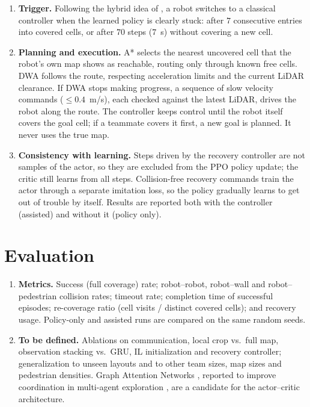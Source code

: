 \documentclass[11pt,a4paper]{article}
\begin{document}
\begin{enumerate}[label=\textbf{\arabic*.},resume]

\item \textbf{Trigger.}
Following the hybrid idea of \cite{carvalho2025deep}, a robot switches to a
classical controller when the learned policy is clearly stuck: after $7$
consecutive entries into covered cells, or after $70$ steps ($7$~s) without
covering a new cell.

\item \textbf{Planning and execution.}
A* selects the nearest uncovered cell that the robot's own map shows as
reachable, routing only through known free cells. DWA follows the route,
respecting acceleration limits and the current LiDAR clearance. If DWA stops
making progress, a sequence of slow velocity commands ($\le 0.4$~m/s), each
checked against the latest LiDAR, drives the robot along the route. The
controller keeps control until the robot itself covers the goal cell; if a
teammate covers it first, a new goal is planned. It never uses the true map.

\item \textbf{Consistency with learning.}
Steps driven by the recovery controller are not samples of the actor, so
they are excluded from the PPO policy update; the critic still learns from
all steps. Collision-free recovery commands train the actor through a
separate imitation loss, so the policy gradually learns to get out of
trouble by itself. Results are reported both with the controller (assisted)
and without it (policy only).

\end{enumerate}

\section{Evaluation}

\begin{enumerate}[label=\textbf{\arabic*.},resume]

\item \textbf{Metrics.}
Success (full coverage) rate; robot--robot, robot--wall and
robot--pedestrian collision rates; timeout rate; completion time of
successful episodes; re-coverage ratio (cell visits / distinct covered
cells); and recovery usage. Policy-only and assisted runs are compared on
the same random seeds.

\item \textbf{To be defined.}
Ablations on communication, local crop vs.\ full map, observation stacking
vs.\ GRU, IL initialization and recovery controller; generalization to
unseen layouts and to other team sizes, map sizes and pedestrian densities.
Graph Attention Networks \cite{velivckovic2017graph}, reported to improve
coordination in multi-agent exploration \cite{chiun2025marvel}, are a
candidate for the actor--critic architecture.

\end{enumerate}
\end{document}
